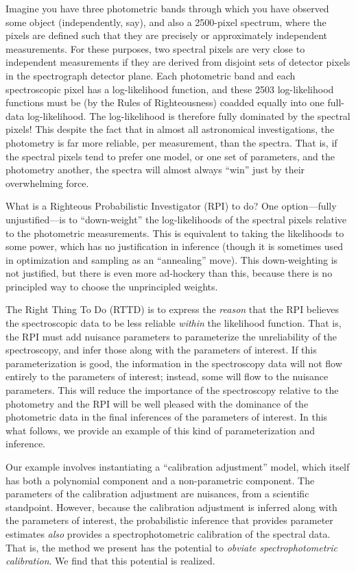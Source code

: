 \documentclass[12pt, letterpaper, preprint]{aastex}
\begin{document}
Imagine you have three photometric bands through which you have
observed some object (independently, say), and also a 2500-pixel
spectrum, where the pixels are defined such that they are precisely or
approximately independent measurements.
For these purposes, two spectral pixels are very close to independent
measurements if they are derived from disjoint sets of detector pixels
in the spectrograph detector plane.
Each photometric band and each spectroscopic pixel has a
log-likelihood function, and these 2503 log-likelihood functions must
be (by the Rules of Righteousness) coadded equally into one full-data
log-likelihood.
The log-likelihood is therefore fully dominated by the spectral
pixels!
This despite the fact that in almost all astronomical investigations,
the photometry is far more reliable, per measurement, than the
spectra.
That is, if the spectral pixels tend to prefer one model, or one set
of parameters, and the photometry another, the spectra will almost
always ``win'' just by their overwhelming force.

What is a Righteous Probabilistic Investigator (RPI) to do?
One option---fully unjustified---is to ``down-weight'' the
log-likelihoods of the spectral pixels relative to the photometric
measurements.
This is equivalent to taking the likelihoods to some power, which has
no justification in inference (though it is sometimes used in
optimization and sampling as an ``annealing'' move).
This down-weighting is not justified, but there is even more
ad-hockery than this, because there is no principled way to choose the
unprincipled weights.

The Right Thing To Do (RTTD) is to express the \emph{reason} that the
RPI believes the spectroscopic data to be less reliable \emph{within}
the likelihood function.
That is, the RPI must add nuisance parameters to parameterize the
unreliability of the spectroscopy, and infer those along with the
parameters of interest.
If this parameterization is good, the information in the spectroscopy
data will not flow entirely to the parameters of interest; instead,
some will flow to the nuisance parameters.
This will reduce the importance of the spectroscopy relative to the
photometry and the RPI will be well pleased with the dominance of the
photometric data in the final inferences of the parameters of
interest.
In this what follows, we provide an example of this kind of
parameterization and inference.

Our example involves instantiating a ``calibration adjustment'' model,
which itself has both a polynomial component and a non-parametric
component.
The parameters of the calibration adjustment are nuisances, from a
scientific standpoint.
However, because the calibration adjustment is inferred along with the
parameters of interest, the probabilistic inference that provides
parameter estimates \emph{also} provides a spectrophotometric
calibration of the spectral data.
That is, the method we present has the potential to \emph{obviate
spectrophotometric calibration}.
We find that this potential is realized.
\end{document}
